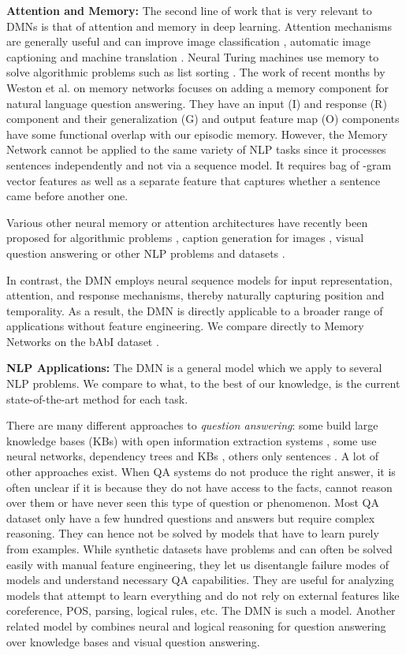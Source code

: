 \documentclass{article}
\begin{document}
\textbf{Attention and Memory:} The second line of work that is very relevant to DMNs is that of attention and memory in deep learning. 
Attention mechanisms are generally useful and can improve image classification \cite{Stollenga2014}, automatic image captioning \cite{Xu2015} and machine translation \cite{Cho2014b,Bahdanau2015}. Neural Turing machines use memory to solve algorithmic problems such as list sorting \cite{Graves2014}. The work of recent months by Weston et al. on memory networks \cite{Weston2015} focuses on adding a memory component for natural language question answering. They have an input (I) and response (R) component and their generalization (G) and output feature map (O) components have some functional overlap with our episodic memory. 
However, the Memory Network cannot be applied to the same variety of NLP tasks since it processes sentences independently and not via a sequence model. It requires bag of -gram vector features as well as a separate feature that captures whether a sentence came before another one. 

Various other neural memory or attention architectures have recently been proposed for algorithmic problems \cite{Joulin2015,Kaiser2015}, caption generation for images \cite{Malinowski2014,Chen2014}, visual question answering \cite{yang2015stacked} or other NLP problems and datasets \cite{Hermann2015}.

In contrast, the DMN employs neural sequence models for input representation, attention, and response mechanisms, thereby naturally capturing position and temporality. As a result, the DMN is directly applicable to a broader range of applications without feature engineering.
We compare directly to Memory Networks on the bAbI dataset \cite{Weston2015ToyTasks}. 

\textbf{NLP Applications:} 
The DMN is a general model which we apply to several NLP problems. We compare to what, to the best of our knowledge, is the current state-of-the-art method for each task. 

There are many different approaches to \emph{question answering}: some build large knowledge bases (KBs) with open information extraction systems \cite{Yates2007}, some use neural networks, dependency trees and KBs \cite{Bordes2012}, others only sentences \cite{Iyyer2014}. A lot of other approaches exist. 
When QA systems do not produce the right answer, it is often unclear if it is because they do not have access to the facts, cannot reason over them or have never seen this type of question or phenomenon. Most QA dataset only have a few hundred questions and answers but require complex reasoning. They can hence not be solved by models that have to learn purely from examples. 
While synthetic datasets \cite{Weston2015ToyTasks} have problems and can often be solved easily with manual feature engineering, they let us disentangle failure modes of models and understand necessary QA capabilities. They are useful for analyzing models that attempt to learn everything and do not rely on external features like coreference, POS, parsing, logical rules, etc. The DMN is such a model.
Another related model by \citet{andreas2016learning} combines neural and logical reasoning for question answering over knowledge bases and visual question answering. 
\end{document}
